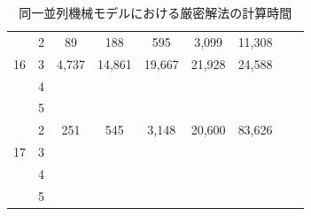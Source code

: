 \documentclass[12pt]{optlab-bachelor}
\begin{document}
\begin{table}[htb]
\begin{center}
\begin{tabular}{|c|c|c|c|c|c|c|c|c|}
      & 2 & 89 & 188 & 595 & 3,099 & 11,308 \\ \cline{2-7}
      16 & 3 & 4,737 & 14,861 & 19,667 & 21,928 & 24,588 \\ \cline{2-7}
      & 4 &  &  &  &  &  \\ \cline{2-7}
      & 5 &  &  &  &  &  \\ \hline \hline

      & 2 & 251 & 545 & 3,148 & 20,600 & 83,626 \\ \cline{2-7}
      17 & 3 &  &  &  &  &  \\ \cline{2-7}
      & 4 &  &  &  &  &  \\ \cline{2-7}
      & 5 &  &  &  &  &  \\ \hline \hline
    \end{tabular}
    \caption{同一並列機械モデルにおける厳密解法の計算時間}
    \label{A6}
  \end{center}
\end{table}
\end{document}
